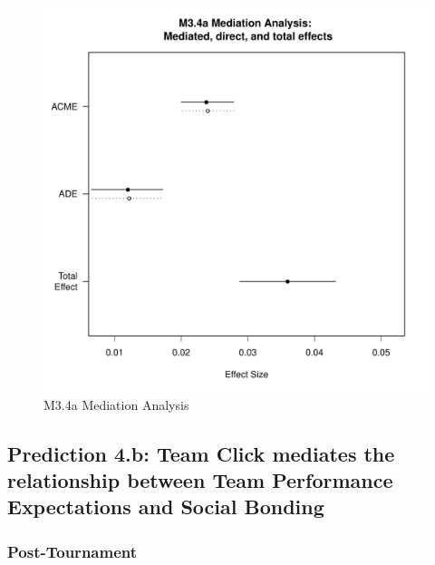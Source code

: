 {           \begin{figure}[htbp]
             \includegraphics[scale=.5]{images/MLM34aMediationAnalysis.pdf}
             \caption{M3.4a Mediation Analysis}
             \label{fig:MLM34aMediationAnalysis}
           \end{figure}







       \subsection{Prediction 4.b: Team Click mediates the relationship between Team Performance Expectations and Social Bonding}

            \subsubsection{Post-Tournament}


}

